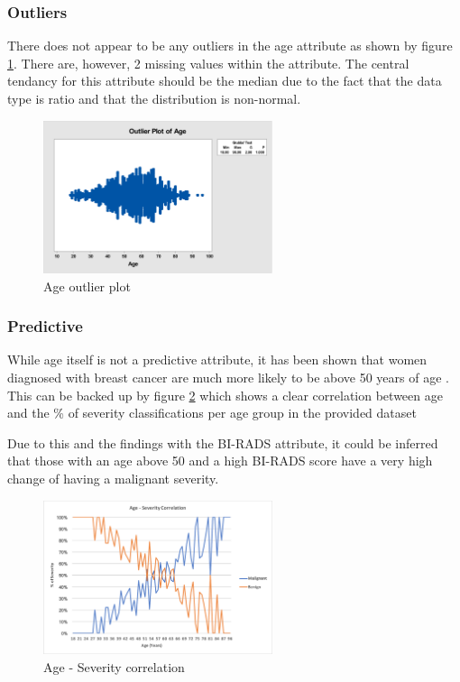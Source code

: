 \documentclass[12pt]{article}
\begin{document}
      \subsubsection{Outliers}
        There does not appear to be any outliers in the age attribute as shown by figure \ref{fig:age-outlier-plot}. There are, however, 2 missing values within the attribute. The central tendancy for this attribute should be the median due to the fact that the data type is ratio and that the distribution is non-normal.

        \begin{figure}[H]
          \centering
          \includegraphics[width=0.6\textwidth]{age-outlier-plot}
          \caption{Age outlier plot}
          \label{fig:age-outlier-plot}
        \end{figure}

      \subsubsection{Predictive}
        While age itself is not a predictive attribute, it has been shown that women diagnosed with breast cancer are much more likely to be above 50 years of age \citep{kerlikowske1993mammography}. This can be backed up by figure \ref{fig:age-severity-correlation} which shows a clear correlation between age and the \% of severity classifications per age group in the provided dataset

        Due to this and the findings with the BI-RADS attribute, it could be inferred that those with an age above 50 and a high BI-RADS score have a very high change of having a malignant severity.

        \begin{figure}[H]
          \centering
          \includegraphics[width=0.6\textwidth]{age-severity-correlation}
          \caption{Age - Severity correlation}
          \label{fig:age-severity-correlation}
        \end{figure}
\end{document}
